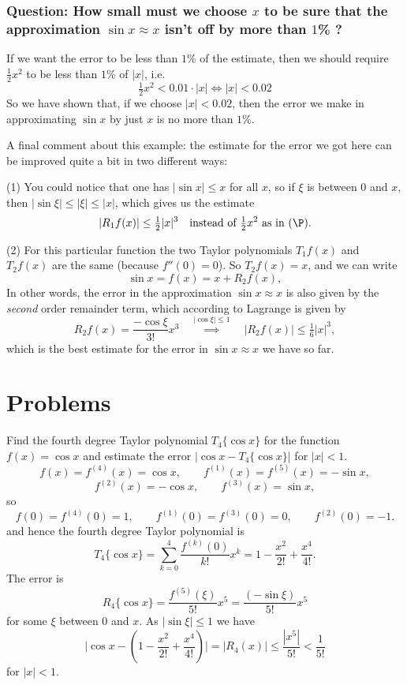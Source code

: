 \subsubsection{Question:  How small must we choose $x$ to be sure that the
approximation $\sin x\approx x$ isn't off by more than $1$\% ?}

If we want the error to be less than $1$\% of the estimate, then we should
require $\frac12x^2$ to be less than $1$\% of $|x|$, i.e.
\[
\tfrac 12 x^2 <0.01\cdot|x| \Leftrightarrow |x| <0.02
\]
So we have shown that, if we  choose $|x|<0.02$, then the error we  make in
approximating $\sin x$ by just $x$ is no more than $1$\%.

A final comment about this example: the estimate for the error we got here
can be improved quite a bit in two different ways:

(1) You could notice that one has $|\sin x|\leq x$ for all $x$, so if $\xi$
is between $0$ and $x$, then $|\sin \xi|\leq |\xi|\leq |x|$, which gives
us  the estimate
\[
\left| R_1f(x) \right| \leq \tfrac12 |x|^3\quad \text{instead of $\tfrac12 x^2$ as
in $(\P)$}.
\]

(2) For this particular function the two Taylor polynomials $T_1f(x)$ and
$T_2f(x)$ are the same (because $f'' (0)=0$). So $T_2f(x) = x$, and we can
write
\[
\sin x = f(x) = x+ R_2f (x),
\]
In other words, the error in the approximation $\sin x\approx x$ is also
given by the \textit{second} order remainder term, which according to
Lagrange is given by
\[
R_2f(x) = \frac{-\cos\xi}{3!}x^3 \quad \stackrel{|\cos
\xi|\leq1}{\implies}\quad \left|R_2f(x)\right|\leq \tfrac16 |x|^3,
\]
which is the best estimate for the error in $\sin x\approx x$ we have so
far.



\section{Problems} %
\problemfont %

\problem Find the fourth degree Taylor polynomial $T_4\{\cos x\}$ for %
the function $f(x)=\cos x$ and estimate the error $|\cos x-T_4\{\cos x\}|$ for
$|x|<1$.
\answer %
\[
f(x)=f^{(4)}(x)=\cos x,\qquad f^{(1)}(x)=f^{(5)}(x)= -\sin x,
\]
\[
f^{(2)}(x)=-\cos x, \qquad f^{(3)}(x)=\sin x,
\]
so
\[
f(0)=f^{(4)}(0)=1, \qquad f^{(1)}(0)=f^{(3)}(0)=0, \qquad f^{(2)}(0)=-1.
\]
and hence the fourth degree Taylor polynomial is
\[
T_4\{\cos x\}=\sum_{k=0}^4 \frac{f^{(k)}(0)}{k!}x^k
=1-\frac{x^2}{2!}+\frac{x^4}{4!}.
\]
The error is
\[
R_4\{\cos x\} = \frac{f^{(5)}(\xi)}{5!}x^5= \frac{(-\sin \xi)}{5!}x^5
\]
for some  $\xi$ between $0$ and $x$. As $|\sin \xi|\le 1$ we
have
\[
\biggl|\cos x - \left(1-\frac{x^2}{2!}+\frac{x^4}{4!}\right)\biggr|=
|R_4(x)|\le \frac{|x^5|}{5!}< \frac{1}{5!}
\]
for $|x|<1$.

